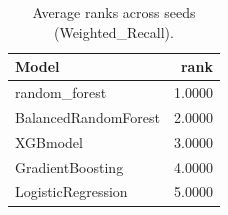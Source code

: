 \begin{table}[t]
\centering
\begin{tabular}{lr}
\toprule
Model & rank \\
\midrule
random_forest & 1.0000 \\
BalancedRandomForest & 2.0000 \\
XGBmodel & 3.0000 \\
GradientBoosting & 4.0000 \\
LogisticRegression & 5.0000 \\
\bottomrule
\end{tabular}
\caption{Average ranks across seeds (Weighted_Recall).}
\label{tab:avg_rank_Weighted_Recall}
\end{table}